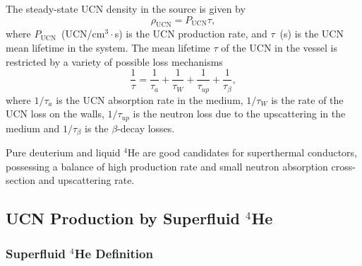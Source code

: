 
The steady-state UCN density in the source is given by
\begin{equation}
\label{ucndensity}
\rho_{\text{UCN}}=P_{\text{UCN}} \tau,
\end{equation}
where $P_{\text{UCN}}$~(UCN/cm$^3 \cdot$s) is the UCN production rate,
and $\tau$~(s) is the UCN mean lifetime in the system.  The mean
lifetime $\tau$ of the UCN in the vessel is restricted by a variety of
possible loss mechanisms
\begin{equation}
\frac{1}{\tau} = \frac{1}{\tau_a}+ \frac{1}{\tau_W}+\frac{1}{\tau_{up}}+\frac{1}{\tau_{\beta}},
\end{equation}
where $1/\tau_a$ is the UCN absorption rate in the medium, $1/\tau_W$
is the rate of the UCN loss on the walls, $1/\tau_{up}$ is the neutron
loss due to the upscattering in the medium and $1/\tau_{\beta}$ is the
$\beta$-decay losses.

Pure deuterium and liquid $^4$He are good candidates for superthermal
conductors, possessing a balance of high production rate and small
neutron absorption cross-section and upscattering rate.


\subsection{UCN Production by Superfluid $^4$He}

\subsubsection{Superfluid $^4$He Definition}


